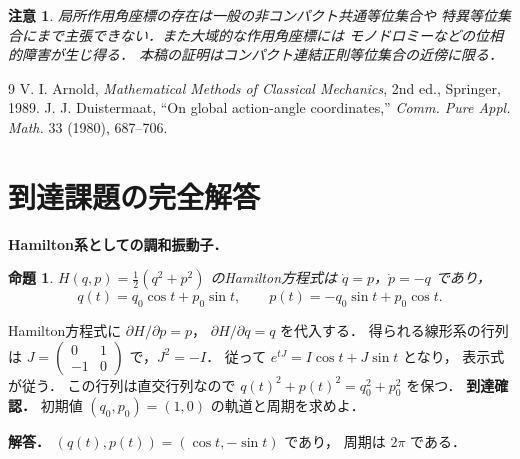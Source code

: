 \documentclass[a5paper,10pt,onecolumn]{jsarticle}
\makeatletter
\theoremstyle{mathnotetheorem}
\newtheorem{proposition}[theorem]{命題}
\newtheorem{remark}[theorem]{注意}
\renewcommand{\proofname}{証明}
\renewenvironment{proof}[1][\proofname]{%
  \par\pushQED{\qed}\normalfont\topsep4\p@\@plus2\p@\relax
  \trivlist\item[\hskip\labelsep\bfseries #1]\ignorespaces
}{\popQED\endtrivlist\@endpefalse}
\makeatother
\begin{document}
\begin{remark}
局所作用角座標の存在は一般の非コンパクト共通等位集合や
特異等位集合にまで主張できない．また大域的な作用角座標には
モノドロミーなどの位相的障害が生じ得る．
本稿の証明はコンパクト連結正則等位集合の\emph{近傍}に限る．
\end{remark}

\begin{thebibliography}{9}
 V. I. Arnold,
 \emph{Mathematical Methods of Classical Mechanics},
 2nd ed., Springer, 1989.
 J. J. Duistermaat,
 ``On global action-angle coordinates,''
 \emph{Comm. Pure Appl. Math.} 33 (1980), 687--706.
\end{thebibliography}


\section{到達課題の完全解答}
\noindent\textbf{Hamilton系としての調和振動子．}
\begin{proposition}
$H(q,p)=\frac12(q^2+p^2)$ のHamilton方程式は
$\dot q=p$，$\dot p=-q$ であり，
\[
q(t)=q_0\cos t+p_0\sin t,\qquad
p(t)=-q_0\sin t+p_0\cos t.
\]
\end{proposition}
\begin{proof}
Hamilton方程式に
$\partial H/\partial p=p$，
$\partial H/\partial q=q$ を代入する．
得られる線形系の行列は
$J=\left(\begin{smallmatrix}0&1\\-1&0\end{smallmatrix}\right)$
で，$J^2=-I$．
従って $e^{tJ}=I\cos t+J\sin t$ となり，
表示式が従う．
この行列は直交行列なので
$q(t)^2+p(t)^2=q_0^2+p_0^2$ を保つ．
\end{proof}
\noindent\textbf{到達確認．}
初期値 $(q_0,p_0)=(1,0)$ の軌道と周期を求めよ．
\par\noindent\textbf{解答．}
$(q(t),p(t))=(\cos t,-\sin t)$ であり，
周期は $2\pi$ である．
\end{document}
